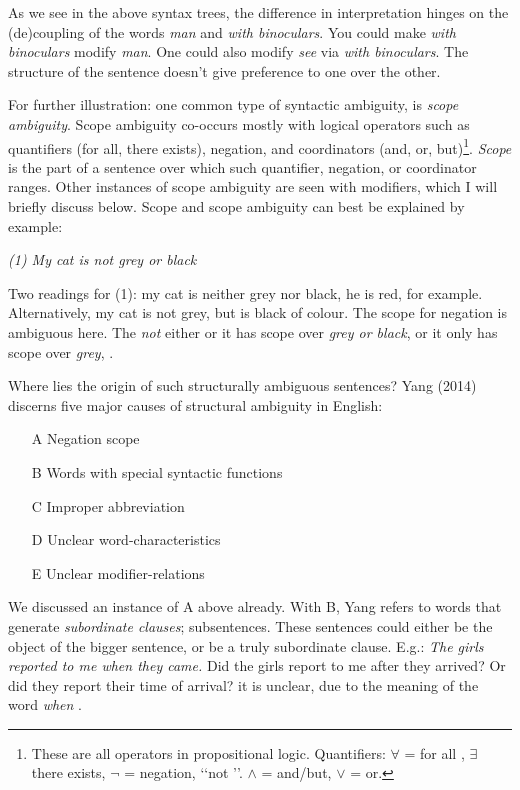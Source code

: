 \noindent As we see in the above syntax trees, the difference in interpretation hinges on the (de)coupling of the words {\it man } and {\it with binoculars}. You could make {\it with binoculars} modify {\it man}. One could also modify {\it see} via {\it with binoculars}. The structure of the sentence doesn't give preference to one over the other.

For further illustration: one common type of syntactic ambiguity, is {\it scope ambiguity}. Scope ambiguity co-occurs mostly with logical operators such as quantifiers (for all, there exists), negation, and coordinators (and, or, but)\footnote{These are all operators in propositional logic. Quantifiers: $\forall $ = for all , $\exists $ there exists, $\neg$ = negation, \lq\lq not \rq\rq. $\wedge$ = and/but, $\vee$ = or.}. {\it Scope} is the part of a sentence over which such quantifier, negation, or coordinator ranges. Other instances of scope ambiguity are seen with modifiers, which I will briefly discuss below. Scope and scope ambiguity can best be explained by example: 

\begin{singlespace*}
\begin{center}
{\it (1) My cat is not grey or black}
\end{center}
\end{singlespace*}


\noindent Two readings for (1): my cat is neither grey nor black, he is red, for example. Alternatively, my cat is not grey, but is black of colour. The scope for negation is ambiguous here. The {\it not} either or it has scope over {\it grey or black}, or it only has scope over {\it grey}, . 


Where lies the origin of such structurally ambiguous sentences? Yang (2014) discerns five major causes of structural ambiguity in English: 

\begin{itemize}
	\item[A] Negation scope 
	\item[B] Words with special syntactic functions
	\item[C] Improper abbreviation
	\item[D] Unclear word-characteristics
	\item[E] Unclear modifier-relations
\end{itemize}

\noindent We discussed an instance of A above already. With B, Yang refers to words that generate {\it subordinate clauses}; subsentences. These sentences could either be the object of the bigger sentence, or be a truly subordinate clause. E.g.: {\it The girls reported to me when they came.} Did the girls report to me after they arrived? Or did they report their time of arrival? it is unclear, due to the meaning of the word {\it when} . 

